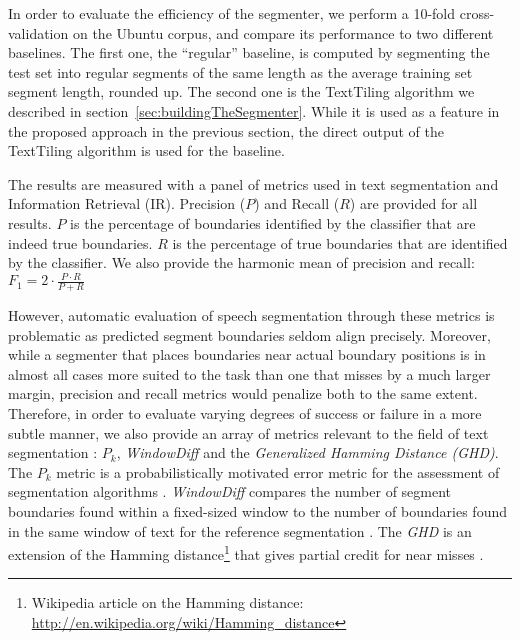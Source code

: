 In order to evaluate the efficiency of the segmenter, we perform a 10-fold cross-validation on the Ubuntu corpus, and compare its performance to two different baselines. The first one, the ``regular'' baseline, is computed by segmenting the test set into regular segments of the same length as the average training set segment length, rounded up. The second one is the TextTiling algorithm we described in section~\ref{sec:buildingTheSegmenter}.
While it is used as a feature in the proposed approach in the previous section, the direct output of the TextTiling algorithm is used for the baseline.


The results are measured with a panel of metrics used in text segmentation and Information Retrieval (IR).
%
Precision ($P$) and Recall ($R$) are provided for all results. $P$ is the percentage of boundaries identified by the classifier that are indeed true boundaries. $R$ is the percentage of true boundaries that are identified by the classifier. 
We also provide the harmonic mean of precision and recall:
$  F_1 = 2 \cdot \frac{P \cdot R}{P + R}$

However, automatic evaluation of speech segmentation through these metrics is problematic as predicted segment boundaries seldom align precisely. 
Moreover, while a segmenter that places boundaries near actual boundary positions is in almost all cases more suited to the task than one that misses by a much larger margin, precision and recall metrics would penalize both to the same extent. 
Therefore, in order to evaluate varying degrees of success or failure in a more subtle manner,
 we also provide an array of metrics relevant to the field of text segmentation : ${P_{k}}$, \textit{WindowDiff} and the \textit{Generalized Hamming Distance (GHD)}.
%
The ${P_{k}}$ metric is a probabilistically motivated error metric for the assessment of segmentation algorithms \cite{beeferman1999statistical}.
%
\textit{WindowDiff} compares the number of segment boundaries found within a fixed-sized window to the number of boundaries found in the same window of text for the reference segmentation \cite{pevzner2002critique}.
%
The \textit{GHD} is an extension of the Hamming distance\footnote{Wikipedia article on the Hamming distance: \url{http://en.wikipedia.org/wiki/Hamming_distance}} that gives partial credit for near misses \cite{bookstein2002generalized}.


